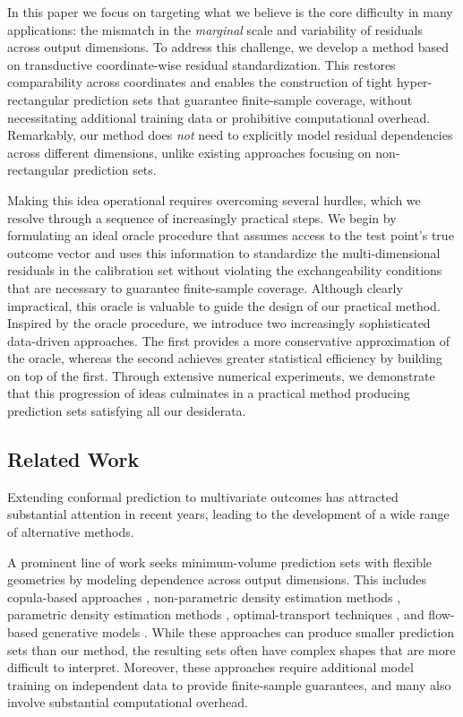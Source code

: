 In this paper we focus on targeting what we believe is the core difficulty in many applications: the mismatch in the {\em marginal} scale and variability of residuals across output dimensions. 
To address this challenge, we develop a method based on transductive coordinate-wise residual standardization. This restores comparability across coordinates and enables the construction of tight hyper-rectangular prediction sets that guarantee finite-sample coverage, without necessitating additional training data or prohibitive computational overhead. Remarkably, our method does {\em not} need to explicitly model residual dependencies across different dimensions, unlike existing approaches focusing on non-rectangular prediction sets.

Making this idea operational requires overcoming several hurdles, which we resolve through a sequence of increasingly practical steps. We begin by formulating an ideal oracle procedure that assumes access to the test point’s true outcome vector and uses this information to standardize the multi-dimensional residuals in the calibration set without violating the exchangeability conditions that are necessary to guarantee finite-sample coverage. Although clearly impractical, this oracle is valuable to guide the design of our practical method.
Inspired by the oracle procedure, we introduce two increasingly sophisticated data-driven approaches. The first provides a more conservative approximation of the oracle, whereas the second achieves greater statistical efficiency by building on top of the first. Through extensive numerical experiments, we demonstrate that this progression of ideas culminates in a practical method producing prediction sets satisfying all our desiderata.


\subsection{Related Work}
\label{sec:related-work}

Extending conformal prediction to multivariate outcomes has attracted substantial attention in recent years, leading to the development of a wide range of alternative methods.

A prominent line of work seeks minimum-volume prediction sets with flexible geometries by modeling dependence across output dimensions.
This includes copula-based approaches \citep{messoudi2021copula, pmlr-v258-park25c, sun2024copula}, non-parametric density estimation methods \citep{sadinle2016least,izbicki2022cdsplit,wang2023pcp, dheur2025unified}, parametric density estimation methods \citep{johnstone2021conformal,braun2025minimum,braun2025multivariate,tumu2024templates}, optimal-transport techniques \citep{thurin2025otcp, klein2025multivariate}, and flow-based generative models \citep{colombo2024normalizing, lee2025flow, fang2025contra}. While these approaches can produce smaller prediction sets than our method, the resulting sets often have complex shapes that are more difficult to interpret. Moreover, these approaches require additional model training on independent data to provide finite-sample guarantees, and many also involve substantial computational overhead.

